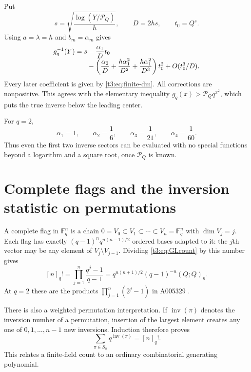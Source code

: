 \documentclass[11pt,openany]{book}
\numberwithin{equation}{chapter}
\theoremstyle{plain}
\theoremstyle{definition}
\theoremstyle{remark}
\newcommand{\F}{\mathbb F}
\newcommand{\pp}[1]{(Q;Q)_{#1}}
\newcommand{\Pinf}{\mathcal P_Q}
\begin{document}
Put
\begin{equation}\label{t3:eq:GLcenter}
 s=\sqrt{\frac{\log(Y/\Pinf)}h},\qquad D=2hs,\qquad t_0=Q^s.
\end{equation}
Using $a=\lambda=h$ and $b_m=\alpha_m$ gives
\begin{align}\label{t3:eq:GLinverse}
 g_q^{-1}(Y)=s
 &-\frac{\alpha_1}{D}t_0\\[-0.4em]
 &-\left(\frac{\alpha_2}{D}
       +\frac{h\alpha_1^2}{D^2}
       +\frac{h\alpha_1^2}{D^3}\right)t_0^2
 +O(t_0^3/D).\notag
\end{align}
Every later coefficient is given by \eqref{t3:eq:finite-dm}. All corrections are nonpositive. This agrees with the elementary inequality
$g_q(x)>\Pinf q^{x^2}$, which puts the true inverse below the leading center.

For $q=2$,
\[
 \alpha_1=1,\qquad\alpha_2=\frac16,\qquad
 \alpha_3=\frac1{21},\qquad\alpha_4=\frac1{60}.
\]
Thus even the first two inverse sectors can be evaluated with no special functions beyond a logarithm and a square root, once $\Pinf$ is known.

\section{Complete flags and the inversion statistic on permutations}

A complete flag in $\F_q^n$ is a chain
$0=V_0\subset V_1\subset\cdots\subset V_n=\F_q^n$ with $\dim V_j=j$.
Each flag has exactly
$(q-1)^n q^{n(n-1)/2}$ ordered bases adapted to it: the $j$th vector may be any element of $V_j\setminus V_{j-1}$.
Dividing \eqref{t3:eq:GLcount} by this number gives
\begin{equation}\label{t3:eq:qfactorial}
 [n]_q!=\prod_{j=1}^n\frac{q^j-1}{q-1}
 =q^{n(n+1)/2}(q-1)^{-n}\pp{n}.
\end{equation}
At $q=2$ these are the products $\prod_{j=1}^n(2^j-1)$ in A005329 \cite{oeisflags}.

There is also a weighted permutation interpretation. If $\operatorname{inv}(\pi)$ denotes the inversion number of a permutation, insertion of the largest element creates any one of $0,1,\ldots,n-1$ new inversions. Induction therefore proves
\begin{equation}\label{t3:eq:Mahonian}
 \sum_{\pi\in S_n}q^{\operatorname{inv}(\pi)}=[n]_q!.
\end{equation}
This relates a finite-field count to an ordinary combinatorial generating polynomial.
\end{document}
